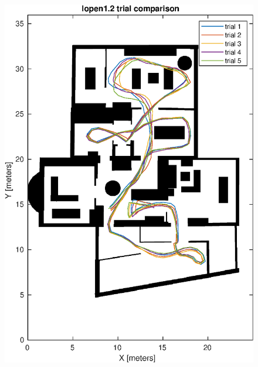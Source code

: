\begin{figure}[H]
\begin{minipage}{.45\textwidth}
		\includegraphics[width=\linewidth]{images/20201107_1142_trial_comparison_2}
		\caption{}
		\label{fig:202011071142trialcomparison2}
	\end{minipage}
\end{figure}


